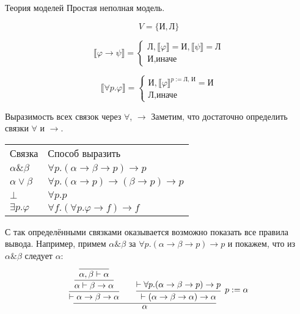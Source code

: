 \documentclass[aspectratio=169]{beamer}
\begin{document}
\begin{frame}{Теория моделей}
Простая неполная модель.

$$V = \{ \text{И}, \text{Л} \}$$

 	
 	
 \begin{center}
 		\begin{equation*}
 		\llbracket \varphi\rightarrow\psi\rrbracket = 
 		\begin{cases}
 			\text{Л}, \llbracket\varphi\rrbracket = \text{И}, \llbracket\psi\rrbracket = \text{Л} \\
 			\text{И}, \text{иначе}
 		\end{cases}
 	\end{equation*}
 \end{center}
 	
 	
 	\begin{equation*}
 		\llbracket\forall p.\varphi\rrbracket = 
 		\begin{cases}
 			\text{И}, \llbracket \varphi\rrbracket^{p:=\text{Л, И}} = \text{И} \\
 			\text{Л}, \text{иначе}
 		\end{cases}
 	\end{equation*}


\end{frame}

\begin{frame}[fragile]{Выразимость всех связок через $\forall$, $\rightarrow$}
Заметим, что достаточно определить связки $\forall$ и $\rightarrow$.\vspace{0.5cm}

\begin{tabular}{ll}
 Связка & Способ выразить \\
 $\alpha\&\beta$ & $\forall p.(\alpha\rightarrow\beta\rightarrow p)\rightarrow p$\\
 $\alpha\vee\beta$ & $\forall p.(\alpha\rightarrow p)\rightarrow (\beta\rightarrow p) \rightarrow p$\\
 $\bot$ & $\forall p.p$ \\
 $\exists p.\varphi$ & $\forall f.(\forall p.\varphi\rightarrow f) \rightarrow f$
\end{tabular}

\vspace{0.5cm}
С так определёнными связками оказывается возможно показать все правила вывода.
Например, примем $\alpha\&\beta$ за $\forall p.(\alpha\rightarrow\beta\rightarrow p)\rightarrow p$ и покажем,
что из $\alpha\&\beta$ следует $\alpha$:
$$\infer{\alpha}{
    \infer{\vdash\alpha\rightarrow\beta\rightarrow\alpha}{\infer{\alpha\vdash\beta\rightarrow\alpha}{\infer{\alpha,\beta\vdash\alpha}{}}}\quad\quad
    \infer[p := \alpha]{\vdash(\alpha\rightarrow\beta\rightarrow \alpha)\rightarrow \alpha}{\vdash\forall p.(\alpha\rightarrow\beta\rightarrow p)\rightarrow p}
}$$

\end{frame}
\end{document}
